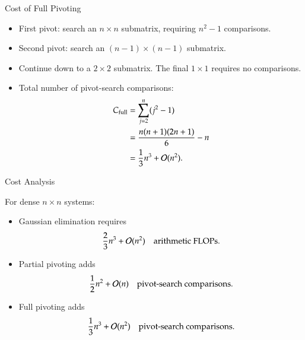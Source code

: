 \documentclass[10pt]{beamer}
\begin{document}

\begin{frame}{Cost of Full Pivoting}
\begin{itemize}
    \item First pivot: search an $n\times n$ submatrix,
    requiring $n^2-1$ comparisons.

    \item Second pivot: search an $(n-1)\times(n-1)$
    submatrix.

    \item Continue down to a $2\times2$ submatrix.
    The final $1\times1$ requires no comparisons.

    \item Total number of pivot-search comparisons:
    \[
    \begin{aligned}
        C_{\mathrm{full}}
        &=\sum_{j=2}^{n}(j^2-1)\\
        &=\frac{n(n+1)(2n+1)}{6}-n\\
        &=\frac13n^3+{\mathcal{O}}(n^2).
    \end{aligned}
    \]
\end{itemize}

    
\end{frame}

\begin{frame}{Cost Analysis}

For dense $n\times n$ systems:

\begin{itemize}
    \item Gaussian elimination requires
    \[
        \frac23n^3+{\mathcal{O}}(n^2)
        \quad \text{arithmetic FLOPs}.
    \]

    \item Partial pivoting adds
    \[
        \frac12n^2+{\mathcal{O}}(n)
        \quad \text{pivot-search comparisons}.
    \]

    \item Full pivoting adds
    \[
        \frac13n^3+{\mathcal{O}}(n^2)
        \quad \text{pivot-search comparisons}.
    \]
\end{itemize}


\end{frame}
\end{document}
